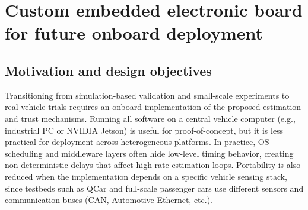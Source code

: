 
\section{Custom embedded electronic board for future onboard deployment}\label{chp6_sec_board}

\subsection{Motivation and design objectives}\label{chp6_subsec_board_motivation}
Transitioning from simulation-based validation and small-scale experiments to real vehicle trials requires an onboard implementation of the proposed estimation and trust mechanisms.
Running all software on a central vehicle computer (e.g., industrial PC or NVIDIA Jetson) is useful for proof-of-concept, but it is less practical for deployment across heterogeneous platforms.
In practice, OS scheduling and middleware layers often hide low-level timing behavior, creating non-deterministic delays that affect high-rate estimation loops.
Portability is also reduced when the implementation depends on a specific vehicle sensing stack, since testbeds such as QCar and full-scale passenger cars use different sensors and communication buses (CAN, Automotive Ethernet, etc.).

